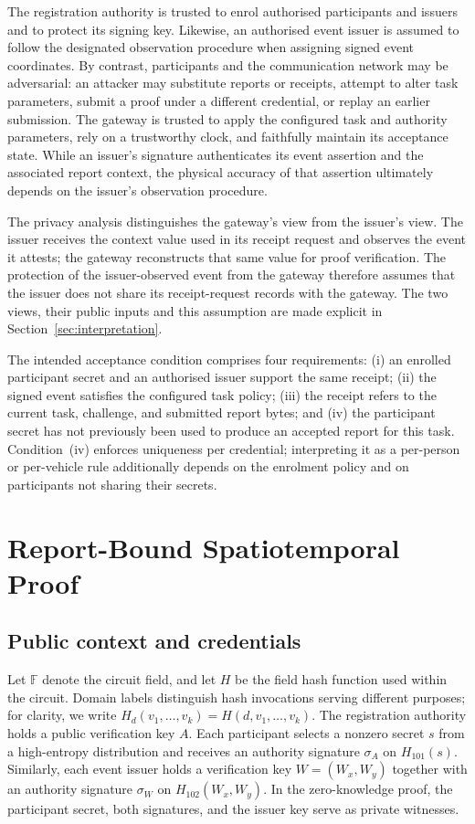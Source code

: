 \documentclass[pdflatex,iicol,sn-mathphys-num]{sn-jnl}
\begin{document}
The registration authority is trusted to enrol authorised participants and issuers and to protect its signing key. Likewise, an authorised event issuer is assumed to follow the designated observation procedure when assigning signed event coordinates. By contrast, participants and the communication network may be adversarial: an attacker may substitute reports or receipts, attempt to alter task parameters, submit a proof under a different credential, or replay an earlier submission. The gateway is trusted to apply the configured task and authority parameters, rely on a trustworthy clock, and faithfully maintain its acceptance state. While an issuer's signature authenticates its event assertion and the associated report context, the physical accuracy of that assertion ultimately depends on the issuer's observation procedure.

The privacy analysis distinguishes the gateway's view from the issuer's view. The issuer receives the context value used in its receipt request and observes the event it attests; the gateway reconstructs that same value for proof verification. The protection of the issuer-observed event from the gateway therefore assumes that the issuer does not share its receipt-request records with the gateway. The two views, their public inputs and this assumption are made explicit in Section~\ref{sec:interpretation}.

The intended acceptance condition comprises four requirements: (i) an enrolled participant secret and an authorised issuer support the same receipt; (ii) the signed event satisfies the configured task policy; (iii) the receipt refers to the current task, challenge, and submitted report bytes; and (iv) the participant secret has not previously been used to produce an accepted report for this task. Condition~(iv) enforces uniqueness per credential; interpreting it as a per-person or per-vehicle rule additionally depends on the enrolment policy and on participants not sharing their secrets.

\section{Report-Bound Spatiotemporal Proof}
\label{sec:protocol}

\subsection{Public context and credentials}
\label{sec:context}

Let $\mathbb F$ denote the circuit field, and let $H$ be the field hash function used within the circuit. Domain labels distinguish hash invocations serving different purposes; for clarity, we write $H_d(v_1,\ldots,v_k)=H(d,v_1,\ldots,v_k)$. The registration authority holds a public verification key $A$. Each participant selects a nonzero secret $s$ from a high-entropy distribution and receives an authority signature $\sigma_A$ on $H_{101}(s)$. Similarly, each event issuer holds a verification key $W=(W_x,W_y)$ together with an authority signature $\sigma_W$ on $H_{102}(W_x,W_y)$. In the zero-knowledge proof, the participant secret, both signatures, and the issuer key serve as private witnesses.
\end{document}
